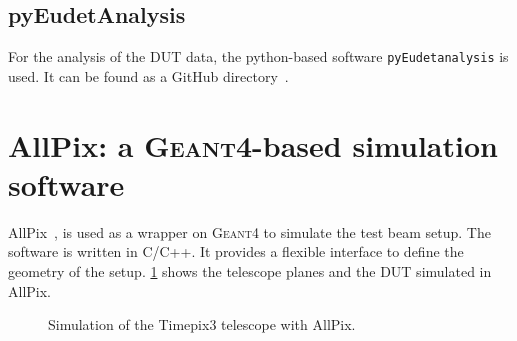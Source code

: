 \subsection{pyEudetAnalysis}
For the analysis of the DUT data, the python-based software
\texttt{pyEudetanalysis} is used. It can be found as a GitHub directory~\cite{pyeudet}.



\section{AllPix: a \textsc{Geant4}-based simulation software}
AllPix~\cite{allpix}, is used as a wrapper on \textsc{Geant4} to
simulate the test beam setup. The software is written in C/C++. It
provides a flexible interface to define the geometry of the
setup. \cref{fig:TPX3TelescopeAllpix} shows the telescope planes
and the DUT simulated in AllPix.

\begin{figure}[htbp]
  \centering
  \caption{Simulation of the Timepix3 telescope with AllPix.}
  \label{fig:TPX3TelescopeAllpix}
\end{figure}

